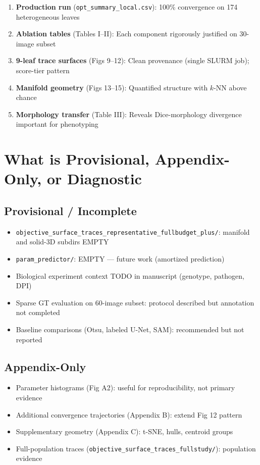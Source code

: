 \documentclass[11pt,a4paper]{article}
\newcommand{\filepath}[1]{\texttt{\small #1}}
\begin{document}
\begin{enumerate}[nosep]
  \item \textbf{Production run} (\filepath{opt\_summary\_local.csv}): 100\% convergence on 174 heterogeneous leaves
  \item \textbf{Ablation tables} (Tables I--II): Each component rigorously justified on 30-image subset
  \item \textbf{9-leaf trace surfaces} (Figs 9--12): Clean provenance (single SLURM job); score-tier pattern
  \item \textbf{Manifold geometry} (Figs 13--15): Quantified structure with $k$-NN above chance
  \item \textbf{Morphology transfer} (Table III): Reveals Dice-morphology divergence important for phenotyping
\end{enumerate}

\section{What is Provisional, Appendix-Only, or Diagnostic}

\subsection{Provisional / Incomplete}
\begin{itemize}[nosep]
  \item \filepath{objective\_surface\_traces\_representative\_fullbudget\_plus/}: manifold and solid-3D subdirs EMPTY
  \item \filepath{param\_predictor/}: EMPTY --- future work (amortized prediction)
  \item Biological experiment context TODO in manuscript (genotype, pathogen, DPI)
  \item Sparse GT evaluation on 60-image subset: protocol described but annotation not completed
  \item Baseline comparisons (Otsu, labeled U-Net, SAM): recommended but not reported
\end{itemize}

\subsection{Appendix-Only}
\begin{itemize}[nosep]
  \item Parameter histograms (Fig A2): useful for reproducibility, not primary evidence
  \item Additional convergence trajectories (Appendix B): extend Fig 12 pattern
  \item Supplementary geometry (Appendix C): t-SNE, hulls, centroid groups
  \item Full-population traces (\filepath{objective\_surface\_traces\_fullstudy/}): population evidence
\end{itemize}
\end{document}

